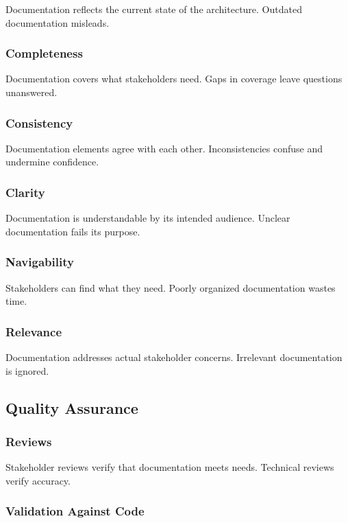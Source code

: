 \documentclass[11pt]{article}
\begin{document}
Documentation reflects the current state of the architecture. Outdated documentation misleads.

\subsubsection{Completeness}

Documentation covers what stakeholders need. Gaps in coverage leave questions unanswered.

\subsubsection{Consistency}

Documentation elements agree with each other. Inconsistencies confuse and undermine confidence.

\subsubsection{Clarity}

Documentation is understandable by its intended audience. Unclear documentation fails its purpose.

\subsubsection{Navigability}

Stakeholders can find what they need. Poorly organized documentation wastes time.

\subsubsection{Relevance}

Documentation addresses actual stakeholder concerns. Irrelevant documentation is ignored.

\subsection{Quality Assurance}

\subsubsection{Reviews}

Stakeholder reviews verify that documentation meets needs. Technical reviews verify accuracy.

\subsubsection{Validation Against Code}
\end{document}
